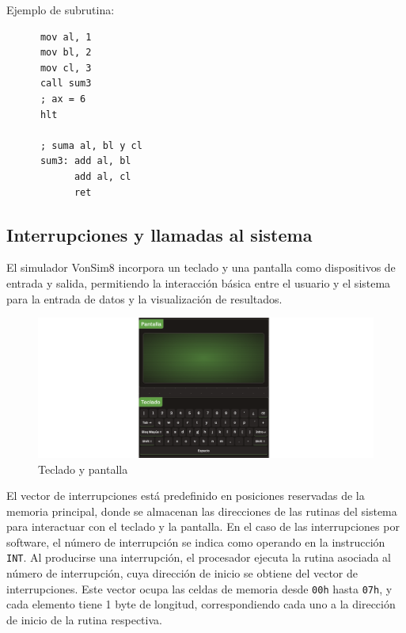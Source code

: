 \documentclass[12pt,oneside]{templates/unerthesis}
\begin{document}
Ejemplo de subrutina:

\begin{lstlisting}
      mov al, 1
      mov bl, 2
      mov cl, 3
      call sum3
      ; ax = 6
      hlt

      ; suma al, bl y cl
      sum3: add al, bl
            add al, cl
            ret\end{lstlisting}

\hypertarget{interrupciones-y-llamadas-al-sistema}{%
\subsection{Interrupciones y llamadas al sistema}\label{interrupciones-y-llamadas-al-sistema}}

El simulador VonSim8 incorpora un teclado y una pantalla como dispositivos de entrada y salida, permitiendo la interacción básica entre el usuario y el sistema para la entrada de datos y la visualización de resultados.

\begin{figure}

{\centering \includegraphics[width=0.85\linewidth]{images/tecladopantalla} 

}

\caption{Teclado y pantalla}\label{fig:tecladopantalla}
\end{figure}

El vector de interrupciones está predefinido en posiciones reservadas de la memoria principal, donde se almacenan las direcciones de las rutinas del sistema para interactuar con el teclado y la pantalla. En el caso de las interrupciones por software, el número de interrupción se indica como operando en la instrucción \texttt{INT}. Al producirse una interrupción, el procesador ejecuta la rutina asociada al número de interrupción, cuya dirección de inicio se obtiene del vector de interrupciones. Este vector ocupa las celdas de memoria desde \texttt{00h} hasta \texttt{07h}, y cada elemento tiene 1 byte de longitud, correspondiendo cada uno a la dirección de inicio de la rutina respectiva.
\end{document}
